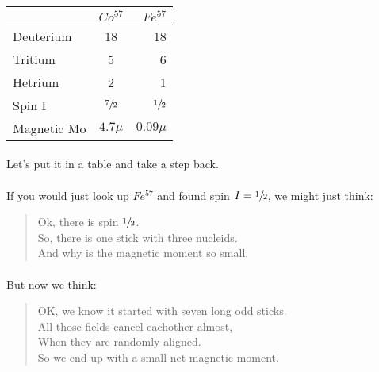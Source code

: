 \begin{center}
  \begin{tabular}{ | l || c | r |}
    \hline
     & $Co^{57}$ & $Fe^{57}$ \\ \hline\hline 
    Deuterium & 18 & 18 \\ \hline 
    Tritium & 5 & 6 \\ \hline 
    Hetrium & 2 & 1 \\ \hline 
    Spin I & $\sfrac{7}{2}$ & $\sfrac{1}{2}$ \\ \hline 
    Magnetic Mo & $4.7\mu$ & $0.09\mu$ \\ \hline 
    \hline
  \end{tabular}
\end{center}
\paragraph{}
Let's put it in a table and take a step back.

\paragraph{}
If you would just look up $Fe^{57}$ and found spin $I = \sfrac{1}{2}$, we might just think: 
\begin{quotation}
Ok, there is spin $\sfrac{1}{2}$.\\
So, there is one stick with three nucleids.\\
And why is the magnetic moment so small.
\end{quotation}

\paragraph{}
But now we think:
\begin{quotation}
OK, we know it started with seven long odd sticks.\\
All those fields cancel eachother almost,\\
When they are randomly aligned.\\
So we end up with a small net magnetic moment.
\end{quotation}




